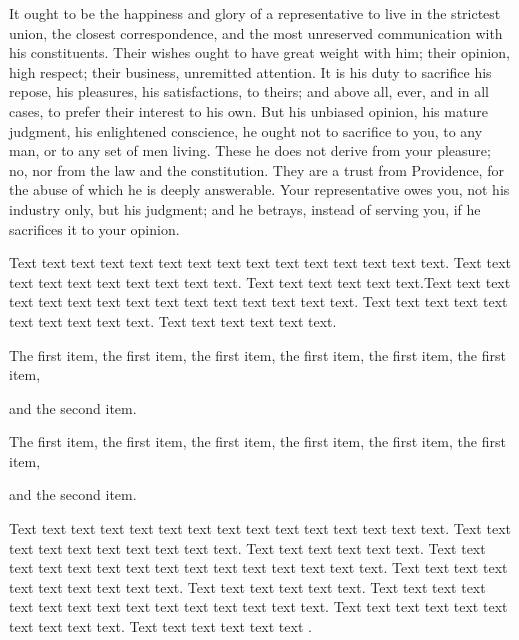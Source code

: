 \begin{quotesmall}
It ought to be the happiness and glory of a representative to live in the strictest union, the closest correspondence, and the most unreserved communication with his constituents. Their wishes ought to have great weight with him; their opinion, high respect; their business, unremitted attention. It is his duty to sacrifice his repose, his pleasures, his satisfactions, to theirs; and above all, ever, and in all cases, to prefer their interest to his own. But his unbiased opinion, his mature judgment, his enlightened conscience, he ought not to sacrifice to you, to any man, or to any set of men living. These he does not derive from your pleasure; no, nor from the law and the constitution. They are a trust from Providence, for the abuse of which he is deeply answerable. Your representative owes you, not his industry only, but his judgment; and he betrays, instead of serving you, if he sacrifices it to your opinion.
\end{quotesmall}

Text text text text text text text text text text text text text text text. Text text text text text text text text text text. Text text text text text text.Text text text text text text text text text text text text text text text. Text text text text text text text text text text. Text text text text text text.

\begin{listi}
	\item The first item, the first item, the first item, the first item, the first item, the first item,
	\item and the second item.
\end{listi}

\begin{lista}
	\item The first item, the first item, the first item, the first item, the first item, the first item, 
	\item and the second item.
\end{lista}

Text text text text text text text text text text text text text text text. Text text text text text text text text text text. Text text text text text text. Text text text text text text text text text text text text text text text. Text text text text text text text text text text. Text text text text text text. Text text text text text text text text text text text text text text text. Text text text text text text text text text text. Text text text text text text \citet{Blomstrom2003}. 